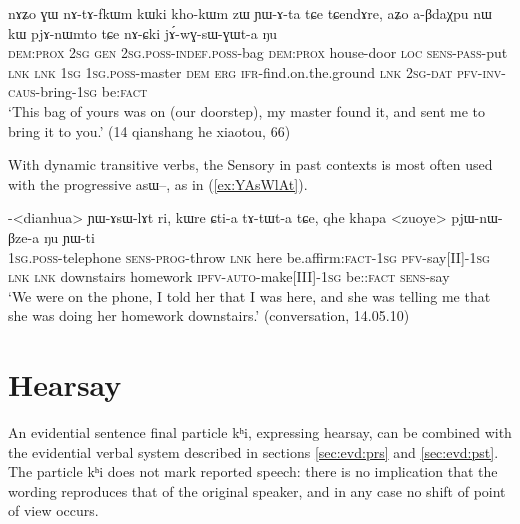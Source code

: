 \documentclass[oldfontcommands,oneside,a4paper,11pt]{article}
\newcommand{\ipa}[1]{{\phon \mbox{#1}}} %
\newcommand{\refb}[1]{(\ref{#1})}
\newcommand{\factual}[1]{\textsc{:fact}}
\begin{document}
\begin{exe}
\ex \label{ex:jAwGsWGWta}
\gll  \ipa{kɯki} 	\ipa{nɤʑo} 	\ipa{ɣɯ} 	\ipa{nɤ-tɤ-fkɯm} 	\ipa{kɯki} 	\ipa{kho-kɯm} 	\ipa{zɯ} 	\ipa{ɲɯ-ɤ-ta} 	\ipa{tɕe} 	\ipa{tɕendɤre,} \ipa{aʑo} 	\ipa{a-βdaχpu} 	\ipa{nɯ} 	\ipa{kɯ} 	\ipa{pjɤ-nɯmto} 	\ipa{tɕe} 	\ipa{nɤ-ɕki} 	\ipa{jɤ́-wɣ-sɯ-ɣɯt-a} 	\ipa{ŋu}  \\
 \textsc{dem:prox}  \textsc{2sg} \textsc{gen} \textsc{2sg.poss-indef.poss}-bag \textsc{dem:prox} house-door \textsc{loc} \textsc{sens-pass}-put \textsc{lnk} \textsc{lnk} \textsc{1sg} \textsc{1sg.poss}-master \textsc{dem} \textsc{erg} \textsc{ifr}-find.on.the.ground  \textsc{lnk} \textsc{2sg-dat} \textsc{pfv-inv-caus}-bring-\textsc{1sg} be\factual{} \\
\glt `This bag of yours was on (our doorstep), my master found it, and sent me to bring it to you.' (14 qianshang he xiaotou, 66)
\end{exe}

With dynamic transitive verbs, the Sensory in past contexts is most often used with the progressive \ipa{asɯ--}, as in \refb{ex:YAsWlAt}.

\begin{exe}
\ex \label{ex:YAsWlAt}
\gll  \ipa{a}-<dianhua> 	\ipa{ɲɯ-ɤsɯ-lɤt} 	\ipa{ri,} 	\ipa{kɯre} 	\ipa{ɕti-a} 	\ipa{tɤ-tɯt-a} 	\ipa{tɕe,} 	\ipa{qhe} 	\ipa{khapa} 	<zuoye> 	\ipa{pjɯ-nɯ-βze-a} 	\ipa{ŋu} 	\ipa{ɲɯ-ti} \\
\textsc{1sg.poss}-telephone \textsc{sens-prog}-throw \textsc{lnk} here be.affirm\factual{}-\textsc{1sg} \textsc{pfv}-say[II]-\textsc{1sg} \textsc{lnk} \textsc{lnk} downstairs homework \textsc{ipfv-auto}-make[III]-\textsc{1sg} be:\factual{} \textsc{sens}-say \\
\glt `We were on the phone, I told her that I was here, and she was telling me that she was doing her homework downstairs.' (conversation, 14.05.10)
\end{exe}

\section{Hearsay}
An evidential sentence final particle \ipa{kʰi}, expressing hearsay, can be combined with the evidential verbal system described in sections \ref{sec:evd:prs} and \ref{sec:evd:pst}. The particle \ipa{kʰi} does not mark reported speech: there is no implication that the wording reproduces that of the original speaker, and in any case no shift of point of view occurs. 
\end{document}
